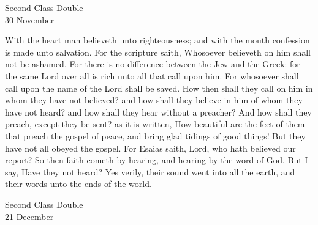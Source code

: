 {}
\fancyhead[RE,LO]{}

\begin{inhead}
    {Second Class Double\\
30 November}
\end{inhead}



 With the heart man believeth unto righteousness; and with the mouth confession is made unto salvation. For the scripture saith, Whosoever believeth on him shall not be ashamed. For there is no difference between the Jew and the Greek: for the same Lord over all is rich unto all that call upon him. For whosoever shall call upon the name of the Lord shall be saved. How then shall they call on him in whom they have not believed? and how shall they believe in him of whom they have not heard? and how shall they hear without a preacher? And how shall they preach, except they be sent? as it is written, How beautiful are the feet of them that preach the gospel of peace, and bring glad tidings of good things! But they have not all obeyed the gospel. For Esaias saith, Lord, who hath believed our report? So then faith cometh by hearing, and hearing by the word of God. But I say, Have they not heard? Yes verily, their sound went into all the earth, and their words unto the ends of the world.

\begin{inhead}
    {Second Class Double\\
21 December}
\end{inhead}


